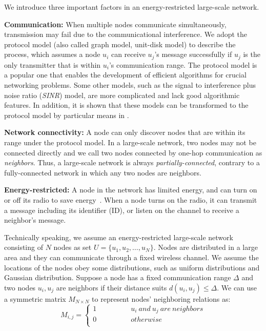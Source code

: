 We introduce three important factors in an energy-restricted large-scale network.

\textbf{Communication:}
When multiple nodes communicate simultaneously, transmission may fail due to the communicational interference. We adopt the protocol model (also called graph model, unit-disk model\cite{moscibroda2006complexity, wang2015connectivity}) to describe the process, which assumes a node $u_i$ can receive $u_j$'s message successfully if $u_j$ is the only transmitter that is within $u_i$'s communication range.
The protocol model is a popular one that enables the development of efficient algorithms for crucial networking problems. Some other models, such as the signal to interference plus noise ratio (\emph{SINR}) model, are more complicated and lack good algorithmic features. In addition, it is shown that these models can be transformed to the protocol model by particular means in \cite{lebhar2009unit}.

\textbf{Network connectivity:}
A node can only discover nodes that are within its range under the protocol model. In a large-scale network, two nodes may not be connected directly and we call two nodes connected by one-hop communication as \emph{neighbors}. Thus, a large-scale network is always \emph{partially-connected}, contrary to a fully-connected network in which any two nodes are neighbors.

\textbf{Energy-restricted:}
A node in the network has limited energy, and can turn on or off its radio to save energy~\cite{dunkels2011contikimac}. When a node turns on the radio, it can transmit a message including its identifier (ID), or listen on the channel to receive a neighbor's message.

Technically speaking, we assume an energy-restricted large-scale network consisting of $N$ nodes as set $U=\{u_1,u_2,\ldots,u_N\}$.  Nodes are distributed in a large area and they can communicate through a fixed wireless channel. We assume the locations of the nodes obey some distributions, such as uniform distributions and Gaussian distribution\cite{wang2013gaussian}.
Suppose a node has a fixed communication range $\Delta$ and two nodes $u_i, u_j$ are neighbors if their distance suits $d(u_i, u_j) \leq \Delta$. We can use a symmetric matrix $M_{N\times N}$ to represent nodes' neighboring relations as:
$$ M_{i,j}=\left\{
\begin{aligned}
1  & & & & & & {u_i ~and~ u_j ~are~ neighbors}\\
0  & & & & & & {otherwise}\\
\end{aligned}
\right.
$$

